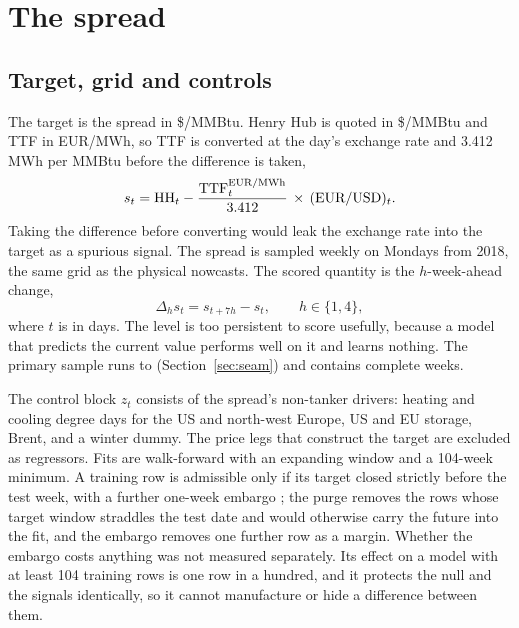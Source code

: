 \section{The spread}\label{sec:partb}

\subsection{Target, grid and controls}

The target is the spread in \$/MMBtu. Henry Hub is quoted in \$/MMBtu and TTF in
EUR/MWh, so TTF is converted at the day's exchange rate and 3.412\,MWh per MMBtu
before the difference is taken,
\begin{equation}
  s_t = \mathrm{HH}_t - \frac{\mathrm{TTF}^{\mathrm{EUR/MWh}}_t}{3.412}\,\times\,(\text{EUR/USD})_t .
  \label{eq:target}
\end{equation}
Taking the difference before converting would leak the exchange rate into the
target as a spurious signal. The spread is sampled weekly on Mondays from 2018, the
same grid as the physical nowcasts. The scored quantity is the $h$-week-ahead change,
\begin{equation}
  \Delta_h s_t = s_{t+7h} - s_t, \qquad h \in \{1, 4\},
  \label{eq:change}
\end{equation}
where $t$ is in days. The level is too persistent to score usefully, because a
model that predicts the current value performs well on it and learns nothing. The
primary sample runs to \noaaEnds{} (Section~\ref{sec:seam}) and contains
\bWeeksCov{} complete weeks.

The control block $z_t$ consists of the spread's non-tanker drivers: heating and
cooling degree days for the US and north-west Europe, US and EU storage, Brent, and
a winter dummy. The price legs that construct the target are excluded as
regressors. Fits are walk-forward with an expanding window and a 104-week minimum.
A training row is admissible only if its target closed strictly before the test
week, with a further one-week embargo \citep{lopezdeprado2018}; the purge removes
the rows whose target window straddles the test date and would otherwise carry the
future into the fit, and the embargo removes one further row as a margin. Whether
the embargo costs anything was not measured separately. Its effect on a model with
at least 104 training rows is one row in a hundred, and it protects the null and
the signals identically, so it cannot manufacture or hide a difference between them.

